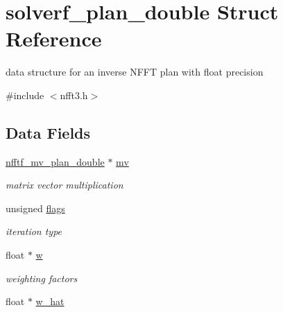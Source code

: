 \hypertarget{structsolverf__plan__double}{\section{solverf\-\_\-plan\-\_\-double Struct Reference}
\label{structsolverf__plan__double}
}


data structure for an inverse N\-F\-F\-T plan with float precision  




{\ttfamily \#include $<$nfft3.\-h$>$}

\subsection*{Data Fields}
\begin{DoxyCompactItemize}
\item 
\hypertarget{structsolverf__plan__double_aaa4fedc5005e075e7f707770384be114}{\hyperlink{structnfftf__mv__plan__double}{nfftf\-\_\-mv\-\_\-plan\-\_\-double} $\ast$ \hyperlink{structsolverf__plan__double_aaa4fedc5005e075e7f707770384be114}{mv}}\label{structsolverf__plan__double_aaa4fedc5005e075e7f707770384be114}

\begin{DoxyCompactList}\small\item\em matrix vector multiplication \end{DoxyCompactList}\item 
\hypertarget{structsolverf__plan__double_a28ce886cb705632f8f866bfb5880795b}{unsigned \hyperlink{structsolverf__plan__double_a28ce886cb705632f8f866bfb5880795b}{flags}}\label{structsolverf__plan__double_a28ce886cb705632f8f866bfb5880795b}

\begin{DoxyCompactList}\small\item\em iteration type \end{DoxyCompactList}\item 
\hypertarget{structsolverf__plan__double_a63c0a528c6e9989c7b0fee6c02d1fbff}{float $\ast$ \hyperlink{structsolverf__plan__double_a63c0a528c6e9989c7b0fee6c02d1fbff}{w}}\label{structsolverf__plan__double_a63c0a528c6e9989c7b0fee6c02d1fbff}

\begin{DoxyCompactList}\small\item\em weighting factors \end{DoxyCompactList}\item 
\hypertarget{structsolverf__plan__double_ab1cada21b9034edfd3a1b2f77252f3be}{float $\ast$ \hyperlink{structsolverf__plan__double_ab1cada21b9034edfd3a1b2f77252f3be}{w\-\_\-hat}}\label{structsolverf__plan__double_ab1cada21b9034edfd3a1b2f77252f3be}


\end{DoxyCompactItemize}
